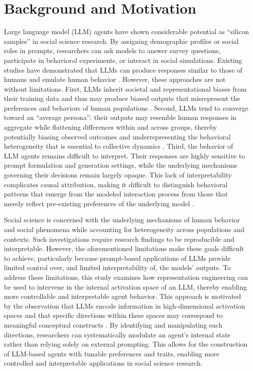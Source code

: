 \documentclass[onecolumn]{main}
\begin{document}
\maketitle

\section{Background and Motivation}
Large language model (LLM) agents have shown considerable potential as “silicon samples” in social science research. By assigning demographic profiles or social roles in prompts, researchers can ask models to answer survey questions, participate in behavioral experiments, or interact in social simulations. Existing studies have demonstrated that LLMs can produce responses similar to those of humans and emulate human behavior \citep{argyle2023,park2023}. However, these approaches are not without limitations. First, LLMs inherit societal and representational biases from their training data and thus may produce biased outputs that misrepresent the preferences and behaviors of human populations \citep{bai2025}. Second, LLMs tend to converge toward an ``average persona'': their outputs may resemble human responses in aggregate while flattening differences within and across groups, thereby potentially biasing observed outcomes and underrepresenting the behavioral heterogeneity that is essential to collective dynamics \citep{wang2025,wu2025}. Third, the behavior of LLM agents remains difficult to interpret. Their responses are highly sensitive to prompt formulation and generation settings, while the underlying mechanisms governing their decisions remain largely opaque. This lack of interpretability complicates causal attribution, making it difficult to distinguish behavioral patterns that emerge from the modeled interaction process from those that merely reflect pre-existing preferences of the underlying model \citep{loya2023}.

Social science is concerned with the underlying mechanisms of human behavior and social phenomena while accounting for heterogeneity across populations and contexts. Such investigations require research findings to be reproducible and interpretable. However, the aforementioned limitations make these goals difficult to achieve, particularly because prompt-based applications of LLMs provide limited control over, and limited interpretability of, the models' outputs. To address these limitations, this study examines how representation engineering can be used to intervene in the internal activation space of an LLM, thereby enabling more controllable and interpretable agent behavior. This approach is motivated by the observation that LLMs encode information in high-dimensional activation spaces and that specific directions within these spaces may correspond to meaningful conceptual constructs \citep{zou2023repe,park2024linear}. By identifying and manipulating such directions, researchers can systematically modulate an agent's internal state rather than relying solely on external prompting. This allows for the construction of LLM-based agents with tunable preferences and traits, enabling more controlled and interpretable applications in social science research.
\end{document}
